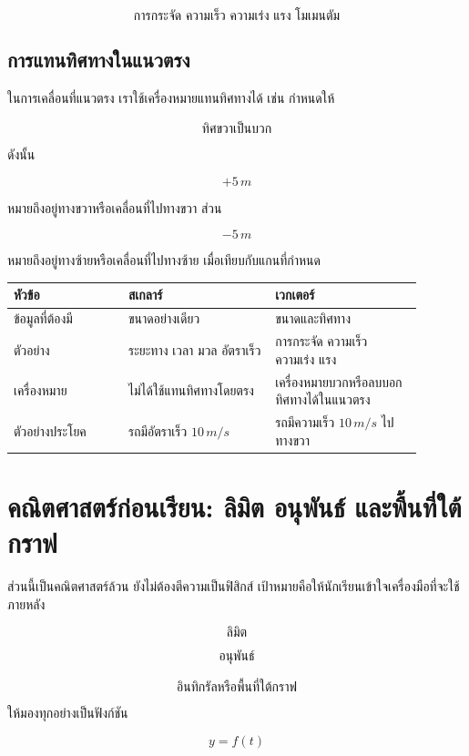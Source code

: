 \[
\text{การกระจัด ความเร็ว ความเร่ง แรง โมเมนตัม}
\]

\subsection{การแทนทิศทางในแนวตรง}

ในการเคลื่อนที่แนวตรง เราใช้เครื่องหมายแทนทิศทางได้ เช่น กำหนดให้

\[
\text{ทิศขวาเป็นบวก}
\]

ดังนั้น

\[
+5\,\si{m}
\]

หมายถึงอยู่ทางขวาหรือเคลื่อนที่ไปทางขวา ส่วน

\[
-5\,\si{m}
\]

หมายถึงอยู่ทางซ้ายหรือเคลื่อนที่ไปทางซ้าย เมื่อเทียบกับแกนที่กำหนด

\begin{center}
\begin{tabular}{|p{0.25\linewidth}|p{0.32\linewidth}|p{0.32\linewidth}|}
\hline
\textbf{หัวข้อ} & \textbf{สเกลาร์} & \textbf{เวกเตอร์} \\
\hline
ข้อมูลที่ต้องมี & ขนาดอย่างเดียว & ขนาดและทิศทาง \\
\hline
ตัวอย่าง & ระยะทาง เวลา มวล อัตราเร็ว & การกระจัด ความเร็ว ความเร่ง แรง \\
\hline
เครื่องหมาย & ไม่ได้ใช้แทนทิศทางโดยตรง & เครื่องหมายบวกหรือลบบอกทิศทางได้ในแนวตรง \\
\hline
ตัวอย่างประโยค & รถมีอัตราเร็ว $10\,\si{m/s}$ & รถมีความเร็ว $10\,\si{m/s}$ ไปทางขวา \\
\hline
\end{tabular}
\end{center}



\section{คณิตศาสตร์ก่อนเรียน: ลิมิต อนุพันธ์ และพื้นที่ใต้กราฟ}

ส่วนนี้เป็นคณิตศาสตร์ล้วน ยังไม่ต้องตีความเป็นฟิสิกส์ เป้าหมายคือให้นักเรียนเข้าใจเครื่องมือที่จะใช้ภายหลัง

\[
\text{ลิมิต}
\]

\[
\text{อนุพันธ์}
\]

\[
\text{อินทิกรัลหรือพื้นที่ใต้กราฟ}
\]

ให้มองทุกอย่างเป็นฟังก์ชัน

\[
y=f(t)
\]

